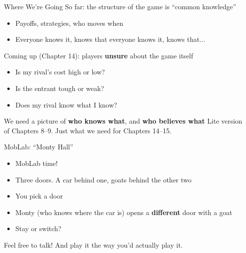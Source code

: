 \frame{\maketitle}

\begin{frame}{Where We're Going}
So far: the structure of the game is ``common knowledge''
\begin{itemize}
    \item Payoffs, strategies, who moves when
    \item Everyone knows it, knows that everyone knows it, knows that...
\end{itemize}
\bsk
Coming up (Chapter 14): players \textbf{unsure} about the game itself
\begin{itemize}
    \item Is my rival's cost high or low?
    \item Is the entrant tough or weak?
    \item Does my rival know what I know?
\end{itemize}
\bsk
We need a picture of \textbf{who knows what}, and \textbf{who believes what}
\vfill
{\footnotesize Lite version of Chapters 8--9. Just what we need for Chapters 14--15.}
\vspace{-0.2in}
\end{frame}

\begin{frame}{MobLab: ``Monty Hall''}
\begin{itemize}
    \item MobLab time!
    \item Three doors. A car behind one, goats behind the other two
    \item You pick a door
    \item Monty (who knows where the car is) opens a \textbf{different} door with a goat
    \item Stay or switch?
\end{itemize}
\vfill
\centering
Feel free to talk! And play it the way you'd actually play it.
\vspace{-0.2in}
\end{frame}

